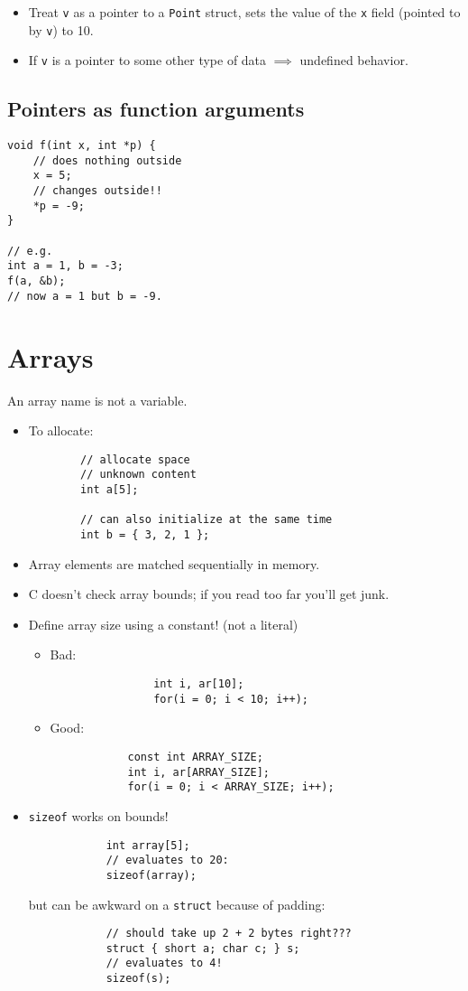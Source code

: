 \begin{itemize}
    \item Treat \texttt{v} as a pointer to a \texttt{Point} struct, sets the value of the \texttt{x} field (pointed to by \texttt{v}) to 10.
    \item If \texttt{v} is a pointer to some other type of data \(\implies\) undefined behavior.
\end{itemize}

\subsection{Pointers as function arguments}
\begin{verbatim}
void f(int x, int *p) {
	// does nothing outside
	x = 5;
	// changes outside!!
	*p = -9;
}

// e.g.
int a = 1, b = -3;
f(a, &b);
// now a = 1 but b = -9.
\end{verbatim}

\section{Arrays}
An array name is not a variable.
\begin{itemize}
	\item To allocate:
		\begin{verbatim}
		// allocate space
		// unknown content
		int a[5];
		
		// can also initialize at the same time
		int b = { 3, 2, 1 };
		\end{verbatim}
	\item Array elements are matched sequentially in memory.
	\item C doesn't check array bounds; if you read too far you'll get junk.
	\item Define array size using a constant! (not a literal)
	\begin{itemize}
		\item Bad:
			\begin{verbatim}
				int i, ar[10];
				for(i = 0; i < 10; i++);
			\end{verbatim}
		\item Good:
			\begin{verbatim}
			const int ARRAY_SIZE;
			int i, ar[ARRAY_SIZE];
			for(i = 0; i < ARRAY_SIZE; i++);
			\end{verbatim}
	\end{itemize}
	\item \texttt{sizeof} works on bounds!
		\begin{verbatim}
			int array[5];
			// evaluates to 20:
			sizeof(array);
		\end{verbatim}
		
		but can be awkward on a \texttt{struct} because of padding:
		\begin{verbatim}
			// should take up 2 + 2 bytes right???
			struct { short a; char c; } s;
			// evaluates to 4!
			sizeof(s);
		\end{verbatim}
\end{itemize}


